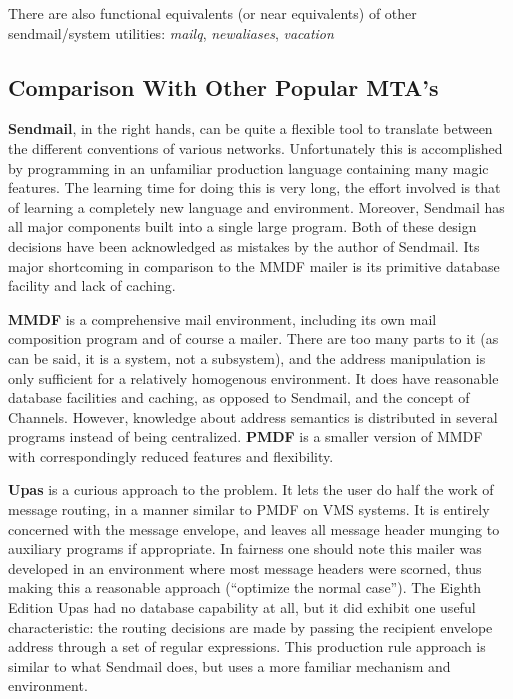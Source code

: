 There are also functional equivalents (or near equivalents) of
other sendmail/system utilities:  {\em mailq\/}, {\em newaliases\/}, {\em vacation\/}




\subsection{Comparison With Other Popular MTA's}

{\bf Sendmail}, in the right hands, can be quite a flexible tool to translate
between the different conventions of various networks.  Unfortunately this
is accomplished by programming in an unfamiliar production language
containing many magic features.  The learning time for doing this is very
long, the effort involved is that of learning a completely new language and
environment. Moreover, Sendmail has all major components built into a
single large program. Both of these design decisions have been acknowledged
as mistakes by the author of Sendmail.  Its major shortcoming in comparison
to the MMDF mailer is its primitive database facility and lack of caching.

{\bf MMDF} is a comprehensive mail environment, including its own mail
composition program and of course a mailer.  There are too many parts to it
(as can be said, it is a system, not a subsystem), and the address
manipulation is only sufficient for a relatively homogenous environment. It
does have reasonable database facilities and caching, as opposed to
Sendmail, and the concept of Channels.  However, knowledge about address
semantics is distributed in several programs instead of being centralized.
{\bf PMDF} is a smaller version of MMDF with correspondingly reduced features and
flexibility.

{\bf Upas} is a curious approach to the problem. It lets the user do half the
work of message routing, in a manner similar to PMDF on VMS systems. It is
entirely concerned with the message envelope, and leaves all message header
munging to auxiliary programs if appropriate. In fairness one should note
this mailer was developed in an environment where most message headers were
scorned, thus making this a reasonable approach (``optimize the normal
case''). The Eighth Edition Upas had no database capability at all, but it
did exhibit one useful characteristic: the routing decisions are made by
passing the recipient envelope address through a set of regular
expressions. This production rule approach is similar to what Sendmail
does, but uses a more familiar mechanism and environment.

